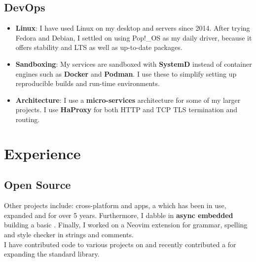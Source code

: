 \subsection{DevOps}
\begin{itemize}
	\item \textbf{Linux}: I have used Linux on my desktop and servers since 2014. After trying Fedora and Debian, I settled on using Pop!\_OS as my daily driver, because it offers stability and LTS as well as up-to-date packages. 	
	\item \textbf{Sandboxing}: My services are sandboxed with \textbf{SystemD} instead of container engines such as \textbf{Docker} and \textbf{Podman}. I use these to simplify setting up reproducible builds and run-time environments.
	\item \textbf{Architecture}: I use a \textbf{micro-services} architecture for some of my larger projects. I use \textbf{HaProxy} for both HTTP and TCP TLS termination and routing.
\end{itemize}

\section{Experience}
\subsection{Open Source}

Other projects include: cross-platform  and  apps, a  which has been in use, expanded and  for over 5 years. Furthermore, I dabble in \textbf{async embedded} building a basic . Finally, I worked on a Neovim extension for grammar, spelling and style checker in strings and comments.\\
\smallskip
I have contributed code to various projects on  and recently contributed a  for expanding the  standard library.

